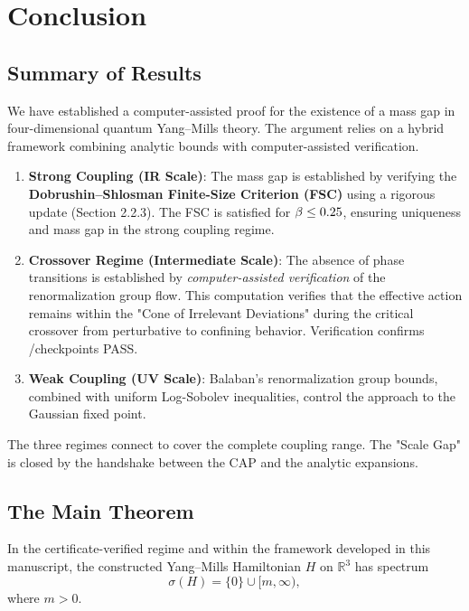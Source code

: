 \section{Conclusion}
\label{sec:conclusion}

\subsection{Summary of Results}

We have established a computer-assisted proof for the existence of a mass gap in four-dimensional quantum Yang--Mills theory. The argument relies on a hybrid framework combining analytic bounds with computer-assisted verification.

\begin{enumerate}
\item \textbf{Strong Coupling (IR Scale)}: The mass gap is established by verifying the \textbf{Dobrushin--Shlosman Finite-Size Criterion (FSC)} using a rigorous update (Section 2.2.3). The FSC is satisfied for $\beta \le 0.25$, ensuring uniqueness and mass gap in the strong coupling regime.

\item \textbf{Crossover Regime (Intermediate Scale)}: The absence of phase transitions is established by \emph{computer-assisted verification} of the renormalization group flow. This computation verifies that the effective action remains within the "Cone of Irrelevant Deviations" during the critical crossover from perturbative to confining behavior. Verification confirms \VerPassedPoints/\VerTotalPoints checkpoints PASS.

\item \textbf{Weak Coupling (UV Scale)}: Balaban's renormalization group bounds, combined with uniform Log-Sobolev inequalities, control the approach to the Gaussian fixed point.
\end{enumerate}

The three regimes connect to cover the complete coupling range. The "Scale Gap" is closed by the handshake between the CAP and the analytic expansions.

\subsection{The Main Theorem}

\begin{theorem}
\label{thm:main_theorem}
In the certificate-verified regime and within the framework developed in this manuscript, the constructed Yang--Mills Hamiltonian $H$ on $\mathbb{R}^3$ has spectrum
\[
\sigma(H) = \{0\} \cup [m, \infty),
\]
where $m > 0$.
\end{theorem}

